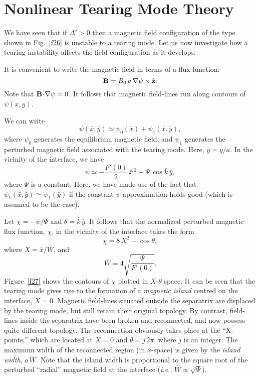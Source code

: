 \section{Nonlinear Tearing Mode Theory}
We have seen that if ${\Delta}'>0$ then a magnetic field configuration
of the type shown in Fig.~\ref{f26} is unstable to a tearing mode.
Let us now investigate how a tearing instability affects the field
configuration as it develops.

It is convenient to write the magnetic field in terms of a flux-function:
\begin{equation}
{\bf B} = B_0\,a\,\nabla\psi\times\hat{\bf z}.
\end{equation}
Note that ${\bf B}\!\cdot\!\nabla\psi=0$. It follows that magnetic field-lines
run along contours of $\psi(x,y)$. 

We can write
\begin{equation}
\psi(\bar{x},\bar{y}) \simeq \psi_0(\bar{x}) + \psi_1(\bar{x},\bar{y}),
\end{equation}
where $\psi_0$ generates the equilibrium magnetic field, and $\psi_1$ generates
the perturbed magnetic field associated with the tearing mode. 
Here, $\bar{y}= y/a$. 
In the vicinity of the interface, we have
\begin{equation}
\psi \simeq - \frac{F'(0)}{2}\,\bar{x}^{~2} + {\Psi}\,\cos \bar{k}\, \bar{y},
\end{equation}
where ${\Psi}$ is a constant. Here, we have made use of the
fact that $\psi_1(\bar{x},\bar{y})\simeq \psi_1(\bar{y})$ if the
constant-$\psi$ approximation holds good (which is assumed to be the case). 

Let   $\chi = -\psi/{\Psi}$ and $\theta=\bar{k}\, \bar{y}$. 
It follows that the normalized perturbed magnetic flux function, $\chi$, 
in the vicinity of the interface takes the form
\begin{equation}
\chi = 8\,X^2 - \cos\theta,
\end{equation}
where $X = \bar{x}/\bar{W}$, and
\begin{equation}
\bar{W} = 4\sqrt{\frac{{\Psi}}{F'(0)}}.
\end{equation}
Figure~\ref{f27} shows the contours of $\chi$ plotted in $X$-$\theta$ space. It can
be seen that the tearing mode 	gives rise to
the formation of a {\em magnetic island} centred on the interface, $X=0$. 
Magnetic field-lines situated outside the separatrix are displaced by the
tearing mode, but still retain their original topology. By contrast, field-lines
inside the separatrix have been broken and reconnected, and now possess
quite different topology. The reconnection obviously takes place at the ``X-points,''
which are located at $X=0$ and $\theta = j\,2\pi$, where $j$ is an integer.
The maximum width of the reconnected region (in $\bar{x}$-space) is given by
the {\em island width}, $a\,\bar{W}$. Note that the island width is proportional
to the square root of the perturbed ``radial'' magnetic field at the interface
({\em i.e.}, $\bar{W}\propto \sqrt{\Psi}$).

